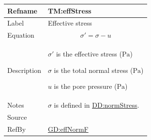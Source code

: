 \documentclass[12pt]{article}
\begin{document}
\medskip
\noindent
\begin{minipage}{\textwidth}
\begin{tabular}{>{\raggedright}p{}>{\raggedright\arraybackslash}p{}}
\toprule \textbf{Refname} & \textbf{TM:effStress}
\label{TM:effStress}
\\ \midrule
Label & Effective stress
        
\\ \midrule
Equation & \begin{displaymath}
           σ'=σ-u
           \end{displaymath}
\\ \midrule
Description & \begin{symbDescription}
              \item{$σ'$ is the effective stress (${\text{Pa}}$)}
              \item{$σ$ is the total normal stress (${\text{Pa}}$)}
              \item{$u$ is the pore pressure (${\text{Pa}}$)}
              \end{symbDescription}
\\ \midrule
Notes & $σ$ is defined in \hyperref[DD:normStress]{DD:normStress}.
        
\\ \midrule
Source & \cite{fredlund1977}
         
\\ \midrule
RefBy & \hyperref[GD:effNormF]{GD:effNormF}
        
\\ \bottomrule
\end{tabular}
\end{minipage}
\end{document}
